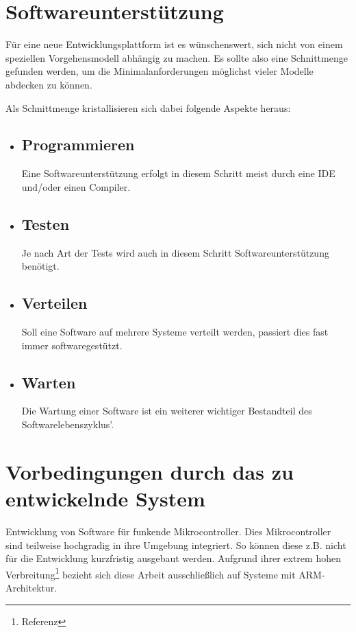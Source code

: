 \iffalse
\section{Softwareunterstützung}
Für eine neue Entwicklungsplattform ist es wünschenswert, sich nicht von einem
speziellen Vorgehensmodell abhängig zu machen. Es sollte also eine Schnittmenge
gefunden werden, um die Minimalanforderungen möglichst vieler Modelle abdecken
zu können.

Als Schnittmenge kristallisieren sich dabei folgende Aspekte heraus:
\begin{itemize}
  \item \subsection*{Programmieren} Eine Softwareunterstützung erfolgt in diesem
  Schritt meist durch eine IDE und/oder einen Compiler.
  \item \subsection*{Testen} Je nach Art der Tests wird auch in diesem Schritt
  Softwareunterstützung benötigt. 
  \item \subsection*{Verteilen} Soll eine Software auf mehrere
  Systeme verteilt werden, passiert dies fast immer softwaregestützt.
  \item \subsection*{Warten} Die Wartung einer Software ist ein weiterer
  wichtiger Bestandteil des Softwarelebenszyklus'.
\end{itemize}
\section{Vorbedingungen durch das zu entwickelnde System}\label{sec:vorb}
Entwicklung von Software für funkende Mikrocontroller. Dies Mikrocontroller sind
teilweise hochgradig in ihre Umgebung integriert. So können diese z.B.
nicht für die Entwicklung kurzfristig ausgebaut werden. Aufgrund ihrer extrem
hohen Verbreitung\footnote{Referenz} bezieht sich diese Arbeit ausschließlich
auf Systeme mit ARM-Architektur.
